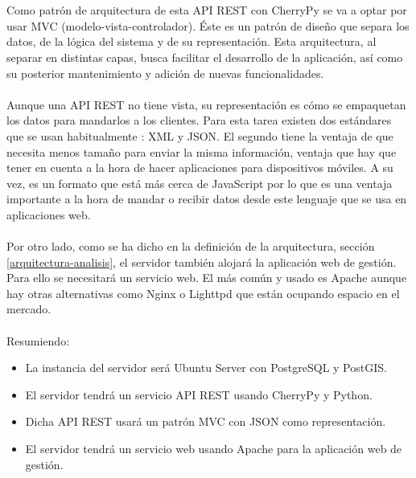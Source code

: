 \\\\
Como patrón de arquitectura de esta API REST con CherryPy se va a optar por usar MVC (modelo-vista-controlador). Éste es un patrón de diseño que separa los datos, de la lógica del sistema y de su representación. Esta arquitectura, al separar en distintas capas, busca facilitar el desarrollo de la aplicación, así como su posterior mantenimiento y adición de nuevas funcionalidades.
\\\\
Aunque una API REST no tiene vista, su representación es cómo se empaquetan los datos para mandarlos a los clientes. Para esta tarea existen dos estándares que se usan habitualmente \cite{xml-vs-json}: XML y JSON. El segundo tiene la ventaja de que necesita menos tamaño para enviar la misma información, ventaja que hay que tener en cuenta a la hora de hacer aplicaciones para dispositivos móviles. A su vez, es un formato que está más cerca de JavaScript por lo que es una ventaja importante a la hora de mandar o recibir datos desde este lenguaje que se usa en aplicaciones web.
\\\\
Por otro lado, como se ha dicho en la definición de la arquitectura, sección \ref{arquitectura-analisis}, el servidor también alojará la aplicación web de gestión. Para ello se necesitará un servicio web. El más común y usado es Apache aunque hay otras alternativas como Nginx \cite{nginx} o Lighttpd \cite{lighttpd} que están ocupando espacio en el mercado.
\\\\
\newpage
Resumiendo:
\begin{itemize}
	\item La instancia del servidor será Ubuntu Server con PostgreSQL y PostGIS.
	\item El servidor tendrá un servicio API REST usando CherryPy y Python.
	\item Dicha API REST usará un patrón MVC con JSON como representación.
	\item El servidor tendrá un servicio web usando Apache para la aplicación web de gestión.
\end{itemize}


